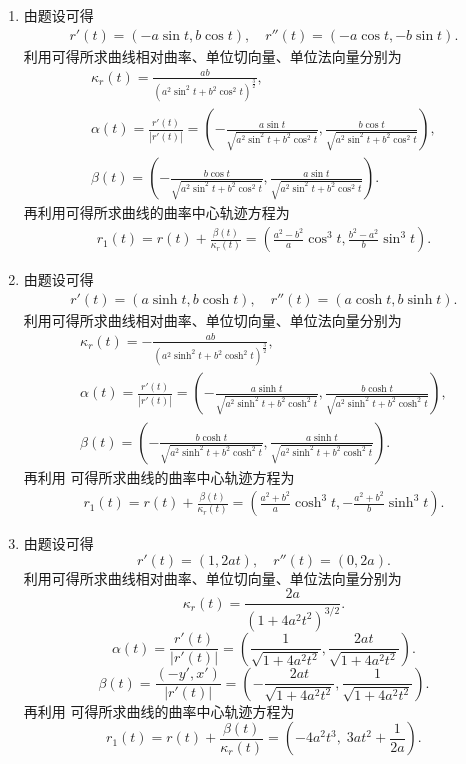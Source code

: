 \documentclass[../../main.tex]{subfiles}%
\begin{document}
\begin{solution}
\begin{enumerate}[(1)]
\item 由题设可得
\begin{align*}
r'(t)=(-a\sin t,b\cos t),\quad r''(t)=(-a\cos t,-b\sin t).
\end{align*}
利用可得所求曲线相对曲率、单位切向量、单位法向量分别为
\begin{gather*}
\kappa_r(t)=\frac{ab}{(a^2\sin^2 t+b^2\cos^2 t)^{\frac{3}{2}}},\\
\alpha(t)=\frac{r'(t)}{|r'(t)|}=\left(-\frac{a\sin t}{\sqrt{a^2\sin^2 t+b^2\cos^2 t}},\frac{b\cos t}{\sqrt{a^2\sin^2 t+b^2\cos^2 t}}\right),\\
\beta(t)=\left(-\frac{b\cos t}{\sqrt{a^2\sin^2 t+b^2\cos^2 t}},\frac{a\sin t}{\sqrt{a^2\sin^2 t+b^2\cos^2 t}}\right).
\end{gather*}
再利用可得所求曲线的曲率中心轨迹方程为
\begin{align*}
r_1(t)=r(t)+\frac{\beta(t)}{\kappa_r(t)}=\left(\frac{a^2-b^2}{a}\cos^3 t,\frac{b^2-a^2}{b}\sin^3 t\right).
\end{align*}

\item 由题设可得
\begin{align*}
r'(t)=(a\sinh t,b\cosh t),\quad r''(t)=(a\cosh t,b\sinh t).
\end{align*}
利用可得所求曲线相对曲率、单位切向量、单位法向量分别为
\begin{gather*}
\kappa_r(t)=-\frac{ab}{(a^2\sinh^2 t+b^2\cosh^2 t)^{\frac{3}{2}}},\\
\alpha(t)=\frac{r'(t)}{|r'(t)|}=\left(-\frac{a\sinh t}{\sqrt{a^2\sinh^2 t+b^2\cosh^2 t}},\frac{b\cosh t}{\sqrt{a^2\sinh^2 t+b^2\cosh^2 t}}\right),\\
\beta(t)=\left(-\frac{b\cosh t}{\sqrt{a^2\sinh^2 t+b^2\cosh^2 t}},\frac{a\sinh t}{\sqrt{a^2\sinh^2 t+b^2\cosh^2 t}}\right).
\end{gather*}
再利用
可得所求曲线的曲率中心轨迹方程为
\begin{align*}
r_1(t)=r(t)+\frac{\beta(t)}{\kappa_r(t)}=\left(\frac{a^2+b^2}{a}\cosh^3 t,-\frac{a^2+b^2}{b}\sinh^3 t\right).
\end{align*}

\item 由题设可得
\[
r'(t)=(1,2at),\quad r''(t)=(0,2a).
\]
利用可得所求曲线相对曲率、单位切向量、单位法向量分别为
\[
\kappa_r(t)=\frac{2a}{(1+4a^2t^2)^{3/2}}.
\]
\[
\alpha(t)=\frac{r'(t)}{|r'(t)|}=\left(\frac{1}{\sqrt{1+4a^2t^2}},\frac{2at}{\sqrt{1+4a^2t^2}}\right).
\]
\[
\beta(t)=\frac{(-y',x')}{|r'(t)|}=\left(-\frac{2at}{\sqrt{1+4a^2t^2}},\frac{1}{\sqrt{1+4a^2t^2}}\right).
\]
再利用
可得所求曲线的曲率中心轨迹方程为
\[
r_1(t)=r(t)+\frac{\beta(t)}{\kappa_r(t)}=\left(-4a^2t^3,\;3at^2+\frac{1}{2a}\right).
\]


\end{enumerate}
\end{solution}
\end{document}
